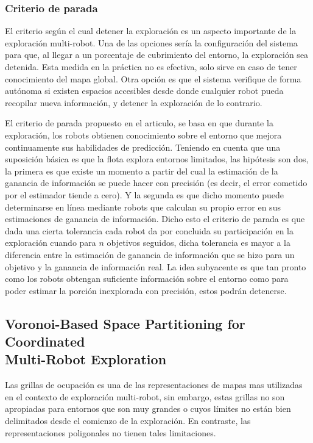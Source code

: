 \subsubsection{Criterio de parada}

El criterio según el cual detener la exploración es un aspecto importante de la exploración multi-robot. Una de las opciones sería la configuración del sistema para que, al llegar a un porcentaje de cubrimiento del entorno, la exploración sea detenida. Esta medida en la práctica no es efectiva, solo sirve en caso de tener conocimiento del mapa global. Otra opción es que el sistema verifique de forma autónoma si existen espacios accesibles desde donde cualquier robot pueda recopilar nueva información, y detener la exploración de lo contrario.

El criterio de parada propuesto en el articulo, se basa en que durante la exploración, los robots obtienen conocimiento sobre el entorno que mejora continuamente sus habilidades de predicción. Teniendo en cuenta que una suposición básica es que la flota explora entornos limitados, las hipótesis son dos, la primera es que existe un momento a partir del cual la estimación de la ganancia de información se puede hacer con precisión (es decir, el error cometido por el estimador tiende a cero). Y la segunda es que dicho momento puede determinarse en línea mediante robots que calculan su propio error en sus estimaciones de ganancia de información. Dicho esto el criterio de parada es que dada una cierta tolerancia cada robot da por concluida su participación en la exploración cuando para $n$ objetivos seguidos, dicha tolerancia es mayor a la diferencia entre la estimación de ganancia de información que se hizo para un objetivo y la ganancia de información real. La idea subyacente es que tan pronto como los robots obtengan suficiente información sobre el entorno como para poder estimar la porción inexplorada con precisión, estos podrán detenerse.

\subsection[Voronoi-Based Space Partitioning for Coordinated Multi-Robot Exploration]{Voronoi-Based Space Partitioning for Coordinated\\ Multi-Robot Exploration} \cite{wu2007voronoi}

Las grillas de ocupación es una de las representaciones de mapas mas utilizadas en el contexto de exploración multi-robot, sin embargo, estas grillas no son apropiadas para entornos que son muy grandes o cuyos límites no están bien delimitados desde el comienzo de la exploración. En contraste, las representaciones poligonales no tienen tales limitaciones.

